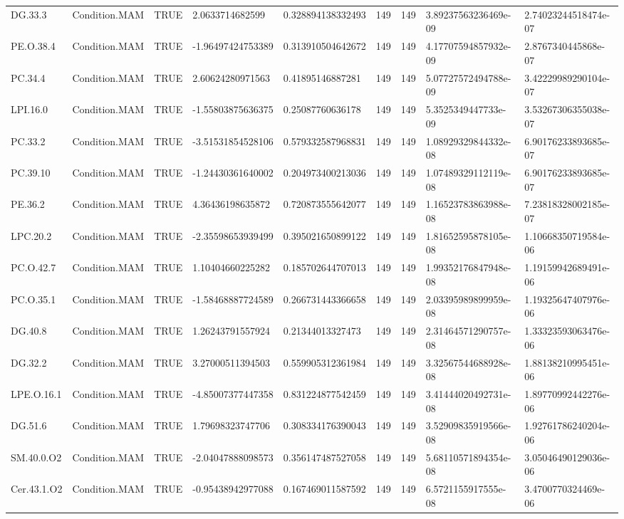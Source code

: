 \begin{longtable}{lllllllll}
DG.33.3 & Condition.MAM & TRUE & 2.0633714682599 & 0.328894138332493 & 149 & 149 & 3.89237563236469e-09 & 2.74023244518474e-07 \\
PE.O.38.4 & Condition.MAM & TRUE & -1.96497424753389 & 0.313910504642672 & 149 & 149 & 4.17707594857932e-09 & 2.8767340445868e-07 \\
PC.34.4 & Condition.MAM & TRUE & 2.60624280971563 & 0.41895146887281 & 149 & 149 & 5.07727572494788e-09 & 3.42229989290104e-07 \\
LPI.16.0 & Condition.MAM & TRUE & -1.55803875636375 & 0.25087760636178 & 149 & 149 & 5.3525349447733e-09 & 3.53267306355038e-07 \\
PC.33.2 & Condition.MAM & TRUE & -3.51531854528106 & 0.579332587968831 & 149 & 149 & 1.08929329844332e-08 & 6.90176233893685e-07 \\
PC.39.10 & Condition.MAM & TRUE & -1.24430361640002 & 0.204973400213036 & 149 & 149 & 1.07489329112119e-08 & 6.90176233893685e-07 \\
PE.36.2 & Condition.MAM & TRUE & 4.36436198635872 & 0.720873555642077 & 149 & 149 & 1.16523783863988e-08 & 7.23818328002185e-07 \\
LPC.20.2 & Condition.MAM & TRUE & -2.35598653939499 & 0.395021650899122 & 149 & 149 & 1.81652595878105e-08 & 1.10668350719584e-06 \\
PC.O.42.7 & Condition.MAM & TRUE & 1.10404660225282 & 0.185702644707013 & 149 & 149 & 1.99352176847948e-08 & 1.19159942689491e-06 \\
PC.O.35.1 & Condition.MAM & TRUE & -1.58468887724589 & 0.266731443366658 & 149 & 149 & 2.03395989899959e-08 & 1.19325647407976e-06 \\
DG.40.8 & Condition.MAM & TRUE & 1.26243791557924 & 0.21344013327473 & 149 & 149 & 2.31464571290757e-08 & 1.33323593063476e-06 \\
DG.32.2 & Condition.MAM & TRUE & 3.27000511394503 & 0.559905312361984 & 149 & 149 & 3.32567544688928e-08 & 1.88138210995451e-06 \\
LPE.O.16.1 & Condition.MAM & TRUE & -4.85007377447358 & 0.831224877542459 & 149 & 149 & 3.41444020492731e-08 & 1.89770992442276e-06 \\
DG.51.6 & Condition.MAM & TRUE & 1.79698323747706 & 0.308334176390043 & 149 & 149 & 3.52909835919566e-08 & 1.92761786240204e-06 \\
SM.40.0.O2 & Condition.MAM & TRUE & -2.04047888098573 & 0.356147487527058 & 149 & 149 & 5.68110571894354e-08 & 3.05046490129036e-06 \\
Cer.43.1.O2 & Condition.MAM & TRUE & -0.95438942977088 & 0.167469011587592 & 149 & 149 & 6.5721155917555e-08 & 3.4700770324469e-06 \\

\end{longtable}
